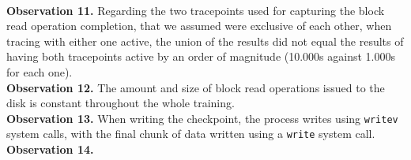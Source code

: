 \documentclass[conference]{IEEEtran}
\begin{document}
\\
\textbf{Observation 11.} Regarding the two tracepoints used for capturing the block read operation completion, that we assumed were exclusive of each other, when tracing with either one active, the union of the results did not equal the results of having both tracepoints active by an order of magnitude (10.000s against 1.000s for each one).
\\
\textbf{Observation 12.} The amount and size of block read operations issued to the disk is constant throughout the whole training.
\\
\textbf{Observation 13.} When writing the checkpoint, the process writes using \texttt{writev} system calls, with the final chunk of data written using a \texttt{write} system call.
\\
\textbf{Observation 14.}


\end{document}
